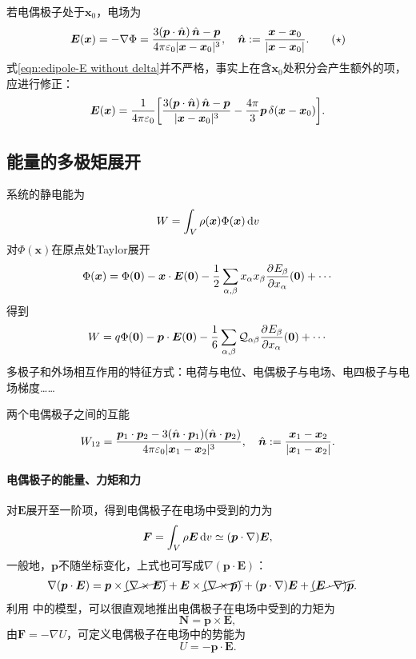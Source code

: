 若电偶极子处于$\bm x_0$，电场为 
\begin{equation}
    \label{eqn:edipole-E without delta}
    \bm E(\bm x)=-\nabla\Phi=\frac{3(\bm p\cdot\mathop{}\!\hat{\bm{n}})\mathop{}\!\hat{\bm{n}}-\bm p}{4\pi\varepsilon_0|\bm x-\bm x_0|^3},\quad \mathop{}\!\hat{\bm{n}}:=\frac{\bm x-\bm x_0}{|\bm x-\bm x_0|}.
    \tag{$\star$}
\end{equation}
式\eqref{eqn:edipole-E without delta}并不严格，事实上在含$\bm x_0$处积分会产生额外的项，应进行修正：
\begin{equation}
    \label{eqn:edipole-E with delta}
    \bm E(\bm x)=\frac1{4\pi\varepsilon_0}\biggl[\frac{3(\bm p\cdot\mathop{}\!\hat{\bm{n}})\mathop{}\!\hat{\bm{n}}-\bm p}{|\bm x-\bm x_0|^3}-\frac{4\pi}3\bm p\mathop{}\!\delta(\bm x-\bm x_0)\biggr].
\end{equation}

\subsection{能量的多极矩展开}
\label{ssec:multipole expansion of energy}

系统的静电能为
\[
    W=\int_V\rho(\bm x)\Phi(\bm x)\mathop{}\!\mathrm{d} v
\]
对$\Phi(\bm x)$在原点处Taylor展开
\[
    \Phi(\bm x)=\Phi(\bm 0)-\bm x\cdot\bm E(\bm 0)-\frac12\sum_{\alpha,\beta}x_\alpha x_\beta\frac{\partial^{{}}E_\beta}{\partial{x_\alpha}^{{}}}(\bm 0)+\cdots
\]
得到 
\begin{equation}
    W=q\Phi(\bm 0)-\bm p\cdot\bm E(\bm 0)-\frac16\sum_{\alpha,\beta}\mathcal Q_{\alpha\beta}\frac{\partial^{{}}E_\beta}{\partial{x_\alpha}^{{}}}(\bm 0)+\cdots
\end{equation}
多极子和外场相互作用的特征方式：电荷与电位、电偶极子与电场、电四极子与电场梯度……

两个电偶极子之间的互能
\begin{equation}
    W_{12}=\frac{\bm p_1\cdot\bm p_2-3(\mathop{}\!\hat{\bm{n}}\cdot\bm p_1)(\mathop{}\!\hat{\bm{n}}\cdot\bm p_2)}{4\pi\varepsilon_0|\bm x_1-\bm x_2|^3},\quad\mathop{}\!\hat{\bm{n}}:=\frac{\bm x_1-\bm x_2}{|\bm x_1-\bm x_2|}.
\end{equation}
\paragraph{电偶极子的能量、力矩和力}对$\bm E$展开至一阶项，得到电偶极子在电场中受到的力为
\begin{equation}
    \bm F=\int_V\rho\bm E\mathop{}\!\mathrm{d} v\simeq(\bm p\cdot\nabla)\bm E,
\end{equation}
一般地，$\bm p$不随坐标变化，上式也可写成$\nabla(\bm p\cdot\bm E)$： 
\begin{align*}
    \nabla(\bm p\cdot\bm E)&=\bm p\times\cancel{(\nabla\times\bm E)}+\bm E\times\cancel{(\nabla\times\bm p)}+(\bm p\cdot\nabla)\bm E+\cancel{(\bm E\cdot\nabla)\bm p}.
\end{align*}
利用 中的模型，可以很直观地推出电偶极子在电场中受到的力矩为
\begin{equation}
    \bm N=\bm p\times\bm E,
\end{equation}
由$\bm F=-\nabla U$，可定义电偶极子在电场中的势能为
\begin{equation}
    U=-\bm p\cdot\bm E.
\end{equation}

